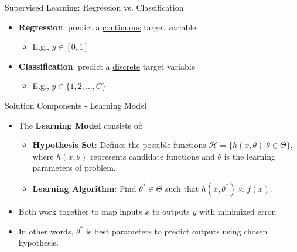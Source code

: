 \documentclass[serif, aspectratio=169]{beamer}
\begin{document}
\begin{frame}{Supervised Learning: Regression vs. Classification}

    \begin{itemize}
        \item \textbf{Regression}: predict a \underline{continuous} target variable
        \begin{itemize}
            \item E.g., $y \in [0, 1]$
        \end{itemize}
        \item \textbf{Classification}: predict a \underline{discrete} target variable
        \begin{itemize}
            \item E.g., $y \in \{1, 2, \ldots, C\}$
        \end{itemize}
    \end{itemize}

\end{frame}



\begin{frame}{Solution Components - Learning Model}
    \begin{itemize}
        \item The \textbf{Learning Model} consists of:
        \begin{itemize}
            \item \textbf{Hypothesis Set}: Defines the possible functions \( \mathcal{H} = \{h(x, \theta) | \theta \in \Theta\} \), where \( h(x, \theta) \) represents candidate functions and \( \theta \) is the learning parameters of problem.
            \item \textbf{Learning Algorithm}: Find \( \theta^* \in \Theta \) such that \( h(x, \theta^*) \approx f(x) \).
        \end{itemize}
        \item Both work together to map inputs \(x\) to outputs \(y\) with minimized error.
        \item In other words, \( \theta^* \) is best parameters to predict outputs using chosen hypothesis.
    \end{itemize}
    \vspace{0.5cm}
\end{frame}
\end{document}
